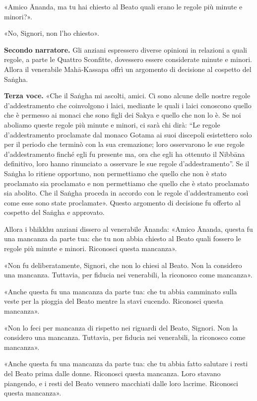 «Amico Ānanda, ma tu hai chiesto al Beato quali erano le regole più
minute e minori?».


«No, Signori, non l’ho chiesto».


\textbf{Secondo narratore.} Gli anziani espressero diverse opinioni in relazioni
a quali regole, a parte le Quattro Sconfitte, dovessero essere
considerate minute e minori. Allora il venerabile Mahā-Kassapa offrì un
argomento di decisione al cospetto del Saṅgha.


\textbf{Terza voce.} «Che il Saṅgha mi ascolti, amici. Ci sono alcune delle
nostre regole d’addestramento che coinvolgono i laici, mediante le quali
i laici conoscono quello che è permesso ai monaci che sono figli dei
Sakya e quello che non lo è. Se noi aboliamo queste regole più minute e
minori, ci sarà chi dirà: “Le regole d’addestramento proclamate dal
monaco Gotama ai suoi discepoli esistettero solo per il periodo che
terminò con la sua cremazione; loro osservarono le sue regole
d’addestramento finché egli fu presente ma, ora che egli ha ottenuto il
Nibbāna definitivo, loro hanno rinunciato a osservare le sue regole
d’addestramento”. Se il Saṅgha lo ritiene opportuno, non permettiamo che
quello che non è stato proclamato sia proclamato e non permettiamo che
quello che è stato proclamato sia abolito. Che il Saṅgha proceda in
accordo con le regole d’addestramento così come esse sono state
proclamate». Questo argomento di decisione fu offerto al cospetto del
Saṅgha e approvato.


Allora i bhikkhu anziani dissero al venerabile Ānanda: «Amico Ānanda,
questa fu una mancanza da parte tua: che tu non abbia chiesto al Beato
quali fossero le regole più minute e minori. Riconosci questa mancanza».


«Non fu deliberatamente, Signori, che non lo chiesi al Beato. Non la
considero una mancanza. Tuttavia, per fiducia nei venerabili, la
riconosco come mancanza».


«Anche questa fu una mancanza da parte tua: che tu abbia camminato sulla
veste per la pioggia del Beato mentre la stavi cucendo. Riconosci questa
mancanza».


«Non lo feci per mancanza di rispetto nei riguardi del Beato, Signori.
Non la considero una mancanza. Tuttavia, per fiducia nei venerabili, la
riconosco come mancanza».


«Anche questa fu una mancanza da parte tua: che tu abbia fatto salutare
i resti del Beato prima dalle donne. Riconosci questa mancanza. Loro
stavano piangendo, e i resti del Beato vennero macchiati dalle loro
lacrime. Riconosci questa mancanza».



